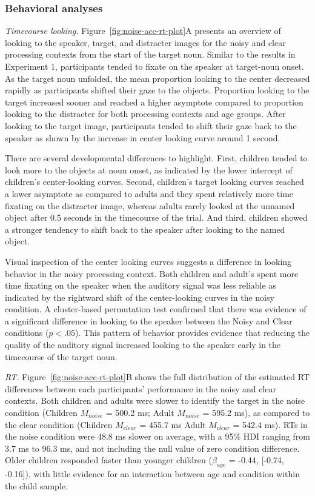 \documentclass[oneside]{report}
\begin{document}
\subsubsection{Behavioral analyses}\label{behavioral-analyses-1}

\emph{Timecourse looking.} Figure~\ref{fig:noise-acc-rt-plot}A presents
an overview of looking to the speaker, target, and distracter images for
the noisy and clear processing contexts from the start of the target
noun. Similar to the results in Experiment 1, participants tended to
fixate on the speaker at target-noun onset. As the target noun unfolded,
the mean proportion looking to the center decreased rapidly as
participants shifted their gaze to the objects. Proportion looking to
the target increased sooner and reached a higher asymptote compared to
proportion looking to the distracter for both processing contexts and
age groups. After looking to the target image, participants tended to
shift their gaze back to the speaker as shown by the increase in center
looking curve around 1 second.

There are several developmental differences to highlight. First,
children tended to look more to the objects at noun onset, as indicated
by the lower intercept of children's center-looking curves. Second,
children's target looking curves reached a lower asymptote as compared
to adults and they spent relatively more time fixating on the distracter
image, whereas adults rarely looked at the unnamed object after 0.5
seconds in the timecourse of the trial. And third, children showed a
stronger tendency to shift back to the speaker after looking to the
named object.

Visual inspection of the center looking curves suggests a difference in
looking behavior in the noisy processing context. Both children and
adult's spent more time fixating on the speaker when the auditory signal
was less reliable as indicated by the rightward shift of the
center-looking curves in the noisy condition. A cluster-based
permutation test confirmed that there was evidence of a significant
difference in looking to the speaker between the Noisy and Clear
conditions (\(p < .05\)). This pattern of behavior provides evidence
that reducing the quality of the auditory signal increased looking to
the speaker early in the timecourse of the target noun.

\emph{RT.} Figure~\ref{fig:noise-acc-rt-plot}B shows the full
distribution of the estimated RT differences between each participants'
performance in the noisy and clear contexts. Both children and adults
were slower to identify the target in the noise condition (Children
\(M_{noise}\) = 500.2 ms; Adult \(M_{noise}\) = 595.2 ms), as compared
to the clear condition (Children \(M_{clear}\) = 455.7 ms Adult
\(M_{clear}\) = 542.4 ms). RTs in the noise condition were 48.8 ms
slower on average, with a 95\% HDI ranging from 3.7 ms to 96.3 ms, and
not including the null value of zero condition difference. Older
children responded faster than younger children (\(\beta_{age}\) =
-0.44, {[}-0.74, -0.16{]}), with little evidence for an interaction
between age and condition within the child sample.
\end{document}
